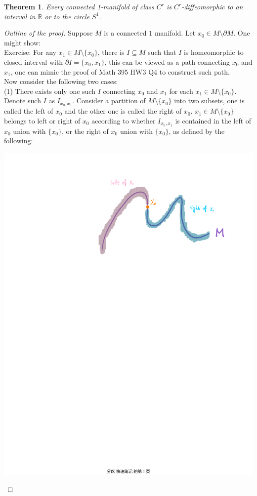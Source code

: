 \documentclass[11pt,oneside]{book}
\theoremstyle{break}
\theoremstyle{break}
\newtheorem{thm}{Theorem}[section]
\newcommand{\R}{\mathbb{R}}
\newcommand{\exercise}{\color{green}Exercise: \color{black}}
\begin{document}
\begin{thm}
Every connected 1-manifold of class $C^r$ is $C^r$-diffeomorphic to an interval in $\R$ or to the circle $S^1$. 
\end{thm}
\begin{proof}[Outline of the proof]
Suppose $M$ is a connected $1$ manifold. Let $x_0 \in M \setminus \partial M$. One might show:\\

\exercise For any $x_1 \in M\setminus\{ x_0\}$, there is $I \subseteq M$ such that $I$ is homeomorphic to closed interval with $\partial I = \{ x_0,x_1\}$, this can be viewed as a path connecting $x_0$ and $x_1$, one can mimic the proof of Math 395 HW3 Q4 to construct such path.\\

Now consider the following two cases:\\
(1) There exists only one such $I$ connecting $x_0$ and $x_1$ for each $x_1\in M\setminus\{ x_0\}$. Denote such $I$ as $I_{x_0,x_1}$. Consider a partition of $M\setminus \{x_0\}$ into two subsets, one is called the left of $x_0$ and the other one is called the right of $x_0$. $x_1 \in M\setminus \{x_0\}$ belongs to left or right of $x_0$ according to whether $I_{x_0,x_1}$ is contained in the left of $x_0$ union with $\{x_0\}$, or the right of $x_0$ union with $\{x_0\}$, as defined by the following:

\begin{center}
\includegraphics[scale=0.5]{1-manifoldHom.pdf}
\end{center}


\end{proof}
\end{document}
